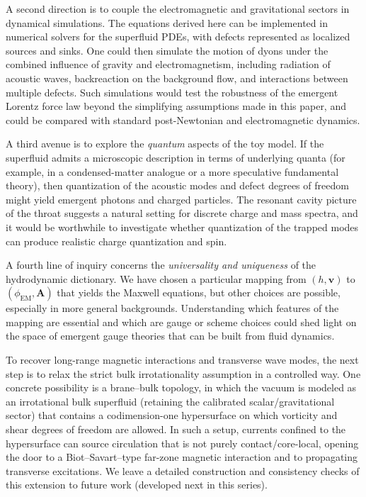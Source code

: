 \documentclass[11pt]{article}
\begin{document}
A second direction is to couple the electromagnetic and gravitational sectors in dynamical simulations.  The equations derived here can be implemented in numerical solvers for the superfluid PDEs, with defects represented as localized sources and sinks.  One could then simulate the motion of dyons under the combined influence of gravity and electromagnetism, including radiation of acoustic waves, backreaction on the background flow, and interactions between multiple defects.  Such simulations would test the robustness of the emergent Lorentz force law beyond the simplifying assumptions made in this paper, and could be compared with standard post-Newtonian and electromagnetic dynamics.

A third avenue is to explore the \emph{quantum} aspects of the toy model.  If the superfluid admits a microscopic description in terms of underlying quanta (for example, in a condensed-matter analogue or a more speculative fundamental theory), then quantization of the acoustic modes and defect degrees of freedom might yield emergent photons and charged particles.  The resonant cavity picture of the throat suggests a natural setting for discrete charge and mass spectra, and it would be worthwhile to investigate whether quantization of the trapped modes can produce realistic charge quantization and spin.

A fourth line of inquiry concerns the \emph{universality and uniqueness} of the hydrodynamic dictionary.  We have chosen a particular mapping from $(h,\mathbf{v})$ to $(\phi_{\mathrm{EM}},\mathbf{A})$ that yields the Maxwell equations, but other choices are possible, especially in more general backgrounds.  Understanding which features of the mapping are essential and which are gauge or scheme choices could shed light on the space of emergent gauge theories that can be built from fluid dynamics.

To recover long-range magnetic interactions and transverse wave modes, the next step is to relax the strict bulk irrotationality assumption in a controlled way. One concrete possibility is a brane–bulk topology, in which the vacuum is modeled as an irrotational bulk superfluid (retaining the calibrated scalar/gravitational sector) that contains a codimension-one hypersurface on which vorticity and shear degrees of freedom are allowed. In such a setup, currents confined to the hypersurface can source circulation that is not purely contact/core-local, opening the door to a Biot–Savart–type far-zone magnetic interaction and to propagating transverse excitations. We leave a detailed construction and consistency checks of this extension to future work (developed next in this series).
\end{document}
